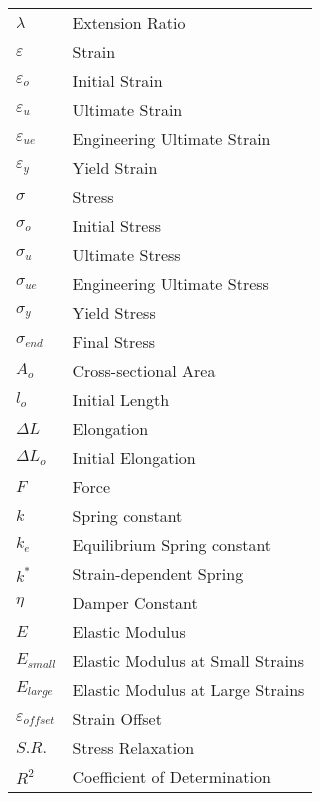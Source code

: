 \begin{Common_Symbols}


\begin{table}[h]
\centering

\begin{tabular}{ll}

$\lambda$   & Extension Ratio \\
$\varepsilon$   & Strain \\
$\varepsilon_o$   & Initial Strain \\
$\varepsilon_{u}$   & Ultimate Strain \\
$\varepsilon_{ue}$   & Engineering Ultimate Strain \\
$\varepsilon_{y}$   & Yield Strain \\
$\sigma$   & Stress \\
$\sigma_o$   & Initial Stress \\
$\sigma_{u}$   & Ultimate Stress \\
$\sigma_{ue}$   & Engineering Ultimate Stress \\
$\sigma_{y}$   & Yield Stress \\
$\sigma_{end}$   & Final Stress \\
$A_o$   & Cross-sectional Area \\
$l_o$   & Initial Length \\
$\Delta L$ & Elongation \\
$\Delta L_o$ & Initial Elongation \\
$F$     & Force \\
$k$     & Spring constant \\
$k_e$     & Equilibrium Spring constant \\
$k^*$     & Strain-dependent Spring \\
$\eta$     & Damper Constant \\
$E$     & Elastic Modulus \\
$E_{small}$     & Elastic Modulus at Small Strains\\
$E_{large}$     & Elastic Modulus at Large Strains\\
$\varepsilon_{offset}$ & Strain Offset \\
$S.R.$      & Stress Relaxation\\
$R^2$      & Coefficient of Determination\\

\end{tabular}


\end{table}
\end{Common_Symbols}
